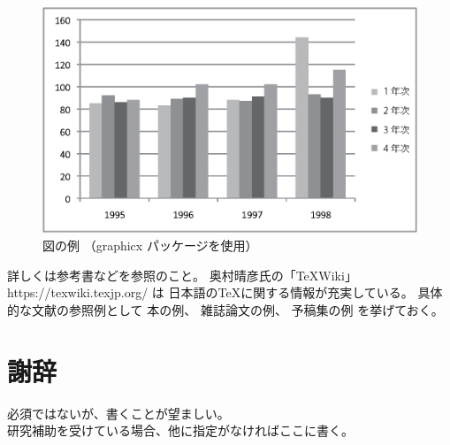 \documentclass[a4paper,11pt]{jreport}
\begin{document}
\begin{figure}[htbp]
\begin{center}
\includegraphics[scale=0.6]{sample.eps}
\end{center}
\caption{図の例 （graphicx パッケージを使用）}
\label{figure:sample}
\end{figure}

詳しくは参考書\cite{okumura2010,yoshinaga2009}などを参照のこと。
奥村晴彦氏の「\TeX Wiki」 https://texwiki.texjp.org/ は
日本語の\TeX に関する情報が充実している。
具体的な文献の参照例として
本の例\cite{ware2004}、
雑誌論文の例\cite{meyer2009}、
予稿集の例\cite{hill2010}
を挙げておく。

\chapter*{謝辞}

必須ではないが、書くことが望ましい。
\\
研究補助を受けている場合、他に指定がなければここに書く。

\newpage

\renewcommand{\bibname}{参考文献}

%
%
\end{document}
